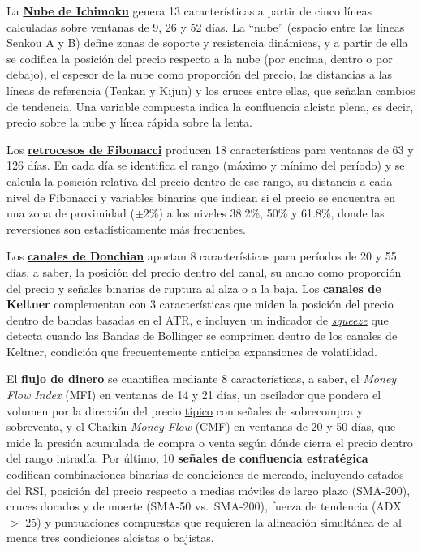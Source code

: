 La \hyperlink{glos:ichimoku}{\textbf{Nube de Ichimoku}} genera 13 caracter\'isticas a partir de cinco l\'ineas calculadas sobre ventanas de 9, 26 y 52 d\'ias. La ``nube'' (espacio entre las l\'ineas Senkou A y B) define zonas de soporte y resistencia din\'amicas, y a partir de ella se codifica la posici\'on del precio respecto a la nube (por encima, dentro o por debajo), el espesor de la nube como proporci\'on del precio, las distancias a las l\'ineas de referencia (Tenkan y Kijun) y los cruces entre ellas, que se\~nalan cambios de tendencia. Una variable compuesta indica la confluencia alcista plena, es decir, precio sobre la nube y l\'inea r\'apida sobre la lenta.

Los \hyperlink{glos:fibonacci}{\textbf{retrocesos de Fibonacci}} producen 18 caracter\'isticas para ventanas de 63 y 126 d\'ias. En cada d\'ia se identifica el rango (m\'aximo y m\'inimo del per\'iodo) y se calcula la posici\'on relativa del precio dentro de ese rango, su distancia a cada nivel de Fibonacci y variables binarias que indican si el precio se encuentra en una zona de proximidad ($\pm 2\%$) a los niveles 38.2\%, 50\% y 61.8\%, donde las reversiones son estad\'isticamente m\'as frecuentes.

Los \hyperlink{glos:donchian}{\textbf{canales de Donchian}} aportan 8 caracter\'isticas para per\'iodos de 20 y 55 d\'ias, a saber, la posici\'on del precio dentro del canal, su ancho como proporci\'on del precio y se\~nales binarias de ruptura al alza o a la baja. Los \textbf{canales de Keltner} complementan con 3 caracter\'isticas que miden la posici\'on del precio dentro de bandas basadas en el ATR, e incluyen un indicador de \hyperlink{glos:squeeze}{\textit{squeeze}} que detecta cuando las Bandas de Bollinger se comprimen dentro de los canales de Keltner, condici\'on que frecuentemente anticipa expansiones de volatilidad.

El \textbf{flujo de dinero} se cuantifica mediante 8 caracter\'isticas, a saber, el \textit{Money Flow Index} (MFI) en ventanas de 14 y 21 d\'ias, un oscilador que pondera el volumen por la direcci\'on del precio \hyperlink{glos:precio_tipico}{t\'ipico} con se\~nales de sobrecompra y sobreventa, y el Chaikin \textit{Money Flow} (CMF) en ventanas de 20 y 50 d\'ias, que mide la presi\'on acumulada de compra o venta seg\'un d\'onde cierra el precio dentro del rango intrad\'ia. Por \'ultimo, 10 \textbf{se\~nales de confluencia estrat\'egica} codifican combinaciones binarias de condiciones de mercado, incluyendo estados del RSI, posici\'on del precio respecto a medias m\'oviles de largo plazo (SMA-200), cruces dorados y de muerte (SMA-50 vs.\ SMA-200), fuerza de tendencia (ADX $>$ 25) y puntuaciones compuestas que requieren la alineaci\'on simult\'anea de al menos tres condiciones alcistas o bajistas.

